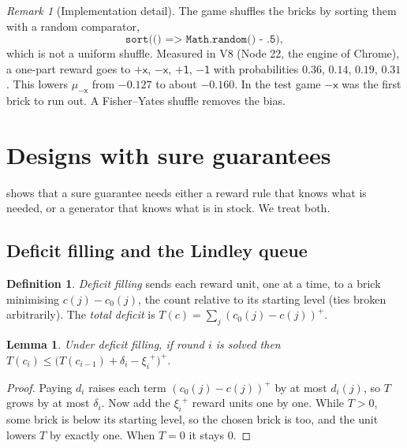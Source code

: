 \documentclass[11pt,a4paper]{article}
\newtheorem{lemma}[theorem]{Lemma}
\theoremstyle{definition}
\newtheorem{definition}[theorem]{Definition}
\theoremstyle{remark}
\newtheorem{remark}[theorem]{Remark}
\newcommand{\pX}{\ensuremath{\mathord{+}\mathsf{x}}}
\newcommand{\mX}{\ensuremath{\mathord{-}\mathsf{x}}}
\newcommand{\pU}{\ensuremath{\mathord{+}\mathsf{1}}}
\newcommand{\mU}{\ensuremath{\mathord{-}\mathsf{1}}}
\newcommand{\pos}[1]{{#1}^{+}}
\begin{document}
\begin{remark}[Implementation detail]\label{rem:shuffle}
The game shuffles the bricks by sorting them with a random comparator,
\[\texttt{sort(() => Math.random() - .5)},\]
which is not a uniform shuffle. Measured in V8 (Node 22, the engine of Chrome), a one-part reward goes
to $\pX$, $\mX$, $\pU$, $\mU$ with probabilities $0.36$, $0.14$, $0.19$, $0.31$. This
lowers $\mu_{\mX}$ from $-0.127$ to about $-0.160$. In the test game $\mX$ was the first
brick to run out. A Fisher--Yates shuffle removes the bias.
\end{remark}

\section{Designs with sure guarantees}\label{sec:sure}

 shows that a sure guarantee needs either a reward rule that knows
what is needed, or a generator that knows what is in stock. We treat both.

\subsection{Deficit filling and the Lindley queue}

\begin{definition}
\emph{Deficit filling} sends each reward unit, one at a time, to a brick minimising
$c(j)-c_0(j)$, the count relative to its starting level (ties broken arbitrarily). The
\emph{total deficit} is $T(c)=\sum_j(c_0(j)-c(j))^+$.
\end{definition}

\begin{lemma}\label{lem:lindley}
Under deficit filling, if round $i$ is solved then
$T(c_i)\le\bigl(T(c_{i-1})+\delta_i-\pos{\xi_i}\bigr)^+$.
\end{lemma}
\begin{proof}
Paying $d_i$ raises each term $(c_0(j)-c(j))^+$ by at most $d_i(j)$, so $T$ grows by at
most $\delta_i$. Now add the $\pos{\xi_i}$ reward units one by one. While $T>0$, some brick
is below its starting level, so the chosen brick is too, and the unit lowers $T$ by
exactly one. When $T=0$ it stays $0$.
\end{proof}
\end{document}
